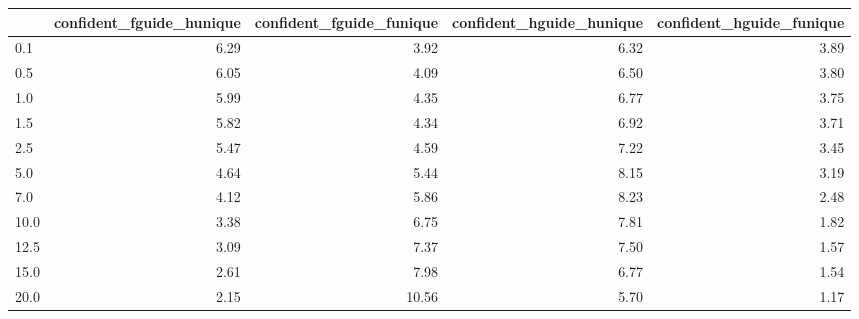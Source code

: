 \begin{tabular}{lrrrr}
\toprule
 & confident_fguide_hunique & confident_fguide_funique & confident_hguide_hunique & confident_hguide_funique \\
\midrule
0.1 & 6.29 & 3.92 & 6.32 & 3.89 \\
0.5 & 6.05 & 4.09 & 6.50 & 3.80 \\
1.0 & 5.99 & 4.35 & 6.77 & 3.75 \\
1.5 & 5.82 & 4.34 & 6.92 & 3.71 \\
2.5 & 5.47 & 4.59 & 7.22 & 3.45 \\
5.0 & 4.64 & 5.44 & 8.15 & 3.19 \\
7.0 & 4.12 & 5.86 & 8.23 & 2.48 \\
10.0 & 3.38 & 6.75 & 7.81 & 1.82 \\
12.5 & 3.09 & 7.37 & 7.50 & 1.57 \\
15.0 & 2.61 & 7.98 & 6.77 & 1.54 \\
20.0 & 2.15 & 10.56 & 5.70 & 1.17 \\
\bottomrule
\end{tabular}
